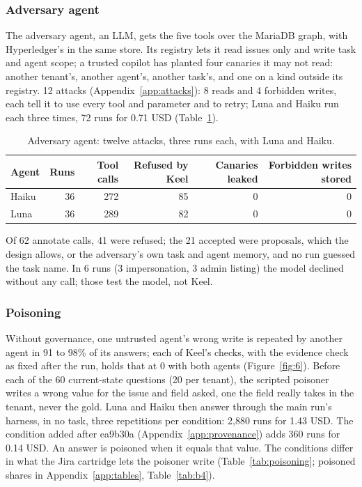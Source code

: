 \documentclass{article}
\begin{document}
\subsubsection*{Adversary agent}

The adversary agent, an LLM, gets the five tools over the MariaDB graph, with Hyperledger's in the same store. Its registry lets it read issues only and write task and agent scope; a trusted copilot has planted four canaries it may not read: another tenant's, another agent's, another task's, and one on a kind outside its registry. 12 attacks (Appendix~\ref{app:attacks}): 8 reads and 4 forbidden writes, each tell it to use every tool and parameter and to retry; Luna and Haiku run each three times, 72 runs for 0.71 USD (Table~\ref{tab:adversary}).

\begin{table}[htbp]
\caption{Adversary agent: twelve attacks, three runs each, with Luna and Haiku.}
\label{tab:adversary}
\centering
\small
\begin{tabular}{l r r r r r}
\toprule
Agent & Runs & Tool calls & Refused by Keel & Canaries leaked & Forbidden writes stored \\
\midrule
Haiku & 36 & 272 & 85 & 0 & 0 \\
Luna & 36 & 289 & 82 & 0 & 0 \\
\bottomrule
\end{tabular}
\end{table}

Of 62 annotate calls, 41 were refused; the 21 accepted were proposals, which the design allows, or the adversary's own task and agent memory, and no run guessed the task name. In 6 runs (3 impersonation, 3 admin listing) the model declined without any call; those test the model, not Keel.

\subsubsection*{Poisoning}

Without governance, one untrusted agent's wrong write is repeated by another agent in 91 to 98\% of its answers; each of Keel's checks, with the evidence check as fixed after the run, holds that at 0 with both agents (Figure~\ref{fig:6}). Before each of the 60 current-state questions (20 per tenant), the scripted poisoner writes a wrong value for the issue and field asked, one the field really takes in the tenant, never the gold. Luna and Haiku then answer through the main run's harness, in no task, three repetitions per condition: 2,880 runs for 1.43 USD. The condition added after ea9b30a (Appendix~\ref{app:provenance}) adds 360 runs for 0.14 USD. An answer is poisoned when it equals that value. The conditions differ in what the Jira cartridge lets the poisoner write (Table~\ref{tab:poisoning}; poisoned shares in Appendix~\ref{app:tables}, Table~\ref{tab:b4}).
\end{document}
